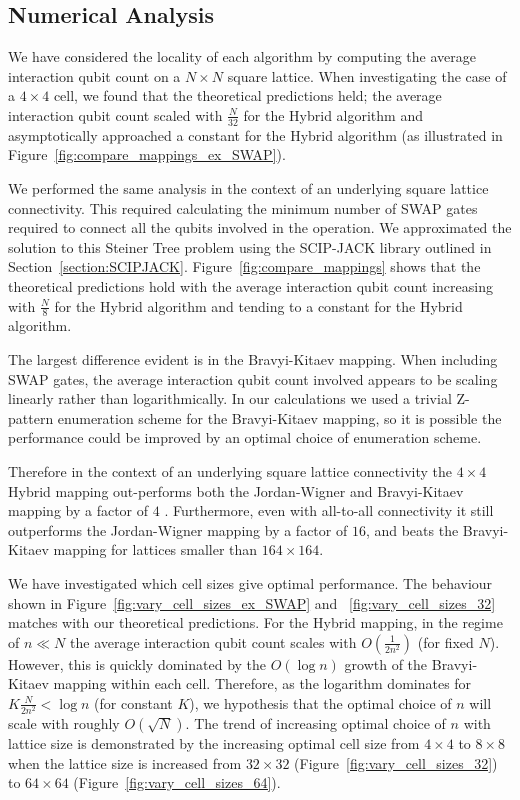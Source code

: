 \documentclass[pdftex,pra,aps,twocolumn,twoside]{revtex4-1}
\theoremstyle{plain}
\theoremstyle{note}
\newcommand\+{{\footnotesize \raisebox{0.3ex}{+}}}
\begin{document}
\subsection{Numerical Analysis}
\label{section:numerical}
We have considered the locality of each algorithm by computing the average interaction qubit count on a $N \times N$ square lattice. When investigating the case of a $4 \times 4$ cell, we found that the theoretical predictions held; the average interaction qubit count scaled with $\frac{N}{32}$ for the Hybrid algorithm and asymptotically approached a constant for the Hybrid\+ algorithm (as illustrated in Figure~\ref{fig:compare_mappings_ex_SWAP}).

We performed the same analysis in the context of an underlying square lattice connectivity. This required calculating the minimum number of SWAP gates required to connect all the qubits involved in the operation. We approximated the solution to this Steiner Tree problem using the SCIP-JACK library outlined in Section~\ref{section:SCIPJACK}. Figure~\ref{fig:compare_mappings} shows that the theoretical predictions hold with the average interaction qubit count increasing with $\frac{N}{8}$ for the Hybrid algorithm and tending to a constant for the Hybrid\+ algorithm.

The largest difference evident is in the Bravyi-Kitaev mapping. When including SWAP gates, the average interaction qubit count involved appears to be scaling linearly rather than logarithmically. In our calculations we used a trivial Z-pattern enumeration scheme for the Bravyi-Kitaev mapping, so it is possible the performance could be improved by an optimal choice of enumeration scheme.

Therefore in the context of an underlying square lattice connectivity the $4 \times 4$ Hybrid mapping out-performs both the Jordan-Wigner and Bravyi-Kitaev mapping by a factor of $4$ . Furthermore, even with all-to-all connectivity it still outperforms the Jordan-Wigner mapping by a factor of $16$, and beats the Bravyi-Kitaev mapping for lattices smaller than $164 \times 164$.

We have investigated which cell sizes give optimal performance. The behaviour shown in Figure~\ref{fig:vary_cell_sizes_ex_SWAP} and ~\ref{fig:vary_cell_sizes_32} matches with our theoretical predictions. For the Hybrid mapping, in the regime of $n \ll N$ the average interaction qubit count scales with $O(\frac{1}{2n^2})$ (for fixed $N$). However, this is quickly dominated by the $O(\log n)$ growth of the Bravyi-Kitaev mapping within each cell. Therefore, as the logarithm dominates for $K\frac{N}{2n^2} < \log n$ (for constant $K$), we hypothesis that the optimal choice of $n$ will scale with roughly $O(\sqrt{N})$. The trend of increasing optimal choice of $n$ with lattice size is demonstrated by the increasing optimal cell size from $4\times 4$ to $8\times 8$ when the lattice size is increased from $32 \times 32$ (Figure~\ref{fig:vary_cell_sizes_32}) to $64 \times 64$ (Figure~\ref{fig:vary_cell_sizes_64}).
\end{document}
